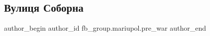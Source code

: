 
 
 
 
 

\subsection{Вулиця Соборна}
\label{sec:03_02_2023.fb.fb_group.mariupol.pre_war.1.vulitsya_soborna}

\ifcmt
 author_begin
   author_id fb_group.mariupol.pre_war
 author_end
\fi
